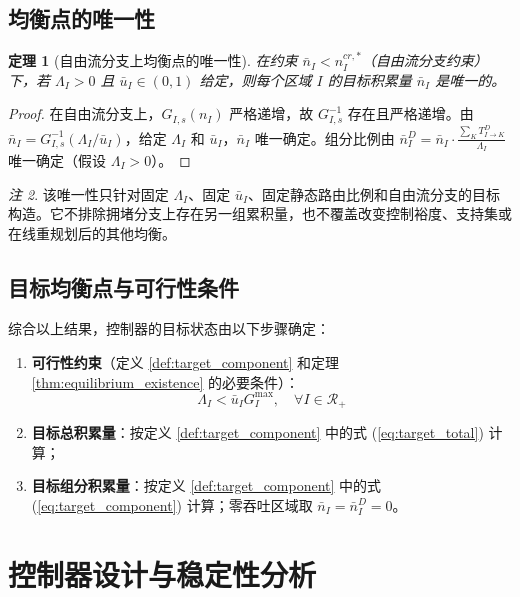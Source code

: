 \documentclass[a4paper,12pt]{article}
\theoremstyle{plain}
\newtheorem{theorem}{定理}[section]
\theoremstyle{definition}
\theoremstyle{remark}
\newtheorem{remark}[theorem]{注}
\begin{document}
\subsection{均衡点的唯一性}

\begin{theorem}[自由流分支上均衡点的唯一性]\label{thm:equilibrium_uniqueness}
在约束 $\bar{n}_I < n_I^{cr,*}$（自由流分支约束）下，若 $\Lambda_I > 0$ 且 $\bar u_I\in(0,1)$ 给定，则每个区域 $I$ 的目标积累量 $\bar{n}_I$ 是唯一的。
\end{theorem}

\begin{proof}
在自由流分支上，$G_{I,s}(n_I)$ 严格递增，故 $G_{I,s}^{-1}$ 存在且严格递增。由 $\bar{n}_I = G_{I,s}^{-1}(\Lambda_I/\bar u_I)$，给定 $\Lambda_I$ 和 $\bar u_I$，$\bar{n}_I$ 唯一确定。组分比例由 $\bar{n}_I^D = \bar{n}_I \cdot \frac{\sum_K T_{I \to K}^D}{\Lambda_I}$ 唯一确定（假设 $\Lambda_I > 0$）。
\end{proof}

\begin{remark}
该唯一性只针对固定 $\Lambda_I$、固定 $\bar u_I$、固定静态路由比例和自由流分支的目标构造。它不排除拥堵分支上存在另一组累积量，也不覆盖改变控制裕度、支持集或在线重规划后的其他均衡。
\end{remark}

\subsection{目标均衡点与可行性条件}

综合以上结果，控制器的目标状态由以下步骤确定：
\begin{enumerate}
    \item \textbf{可行性约束}（定义 \ref{def:target_component} 和定理 \ref{thm:equilibrium_existence} 的必要条件）：
    \begin{equation} \label{eq:feasibility}
        \Lambda_I < \bar u_I G_I^{\max}, \quad \forall I \in \mathcal{R}_+
    \end{equation}
    \item \textbf{目标总积累量}：按定义 \ref{def:target_component} 中的式 (\ref{eq:target_total}) 计算；
    \item \textbf{目标组分积累量}：按定义 \ref{def:target_component} 中的式 (\ref{eq:target_component}) 计算；零吞吐区域取 $\bar n_I=\bar n_I^D=0$。
\end{enumerate}

\section{控制器设计与稳定性分析}
\end{document}
